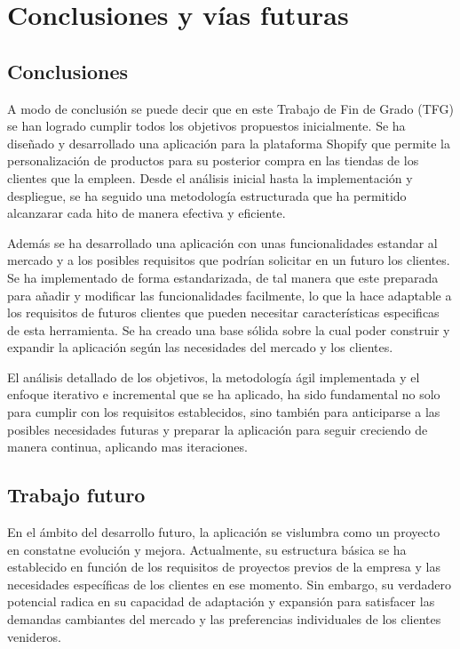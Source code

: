 \documentclass[12pt]{article}
\begin{document}
\clearpage
\section{Conclusiones y vías futuras}

\subsection{Conclusiones}
A modo de conclusión se puede decir que en este Trabajo de Fin de Grado (TFG) se han logrado cumplir todos
los objetivos propuestos inicialmente. Se ha diseñado y desarrollado una aplicación para la plataforma Shopify que 
permite la personalización de productos para su posterior compra en las tiendas de los clientes que la empleen.
Desde el análisis inicial hasta la implementación y despliegue, se ha seguido una metodología estructurada que ha permitido
alcanzarar cada hito de manera efectiva y eficiente.

Además se ha desarrollado una aplicación con unas funcionalidades estandar al mercado y a los posibles requisitos que podrían solicitar en un futuro
los clientes. Se ha implementado de forma estandarizada, de tal manera que este preparada para añadir y modificar las funcionalidades facilmente, lo que la hace
adaptable a los requisitos de futuros clientes que pueden necesitar características especificas de esta herramienta.
Se ha creado una base sólida sobre la cual poder construir y expandir la aplicación según las necesidades del mercado y los clientes.

El análisis detallado de los objetivos, la metodología ágil implementada y el enfoque iterativo e incremental que se ha aplicado,
ha sido fundamental no solo para cumplir con los requisitos establecidos, sino también para anticiparse a las posibles necesidades futuras y
preparar la aplicación para seguir creciendo de manera continua, aplicando mas iteraciones.

\subsection{Trabajo futuro}
En el ámbito del desarrollo futuro, la aplicación se vislumbra como un proyecto en constatne evolución y mejora. Actualmente, su estructura básica se ha 
establecido en función de los requisitos de proyectos previos de la empresa y las necesidades específicas de los clientes en ese momento. Sin embargo, su 
verdadero potencial radica en su capacidad de adaptación y expansión para satisfacer las demandas cambiantes del mercado y las preferencias individuales de los 
clientes venideros.
\end{document}
